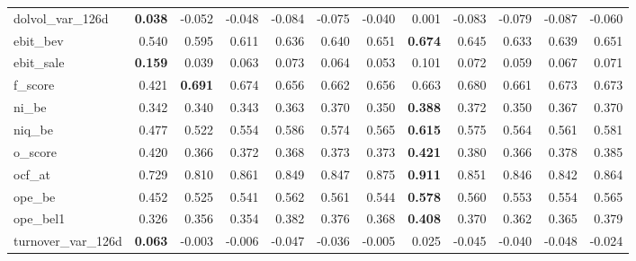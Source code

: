 \begin{landscape}
\begin{longtable}{>{\raggedright\arraybackslash}p{2.6cm}rrrrrrrrrrr}
dolvol\_var\_126d & \textbf{0.038} & -0.052 & -0.048 & -0.084 & -0.075 & -0.040 & 0.001 & -0.083 & -0.079 & -0.087 & -0.060 \\
ebit\_bev & 0.540 & 0.595 & \cellcolor{blue!10}0.611 & \cellcolor{blue!10}0.636 & \cellcolor{blue!10}0.640 & \cellcolor{blue!10}0.651 & \textbf{\cellcolor{blue!10}0.674} & \cellcolor{blue!10}0.645 & \cellcolor{blue!10}0.633 & \cellcolor{blue!10}0.639 & \cellcolor{blue!10}0.651 \\
ebit\_sale & \textbf{0.159} & 0.039 & 0.063 & 0.073 & 0.064 & 0.053 & 0.101 & 0.072 & 0.059 & 0.067 & 0.071 \\
f\_score & 0.421 & \textbf{0.691} & 0.674 & 0.656 & 0.662 & 0.656 & 0.663 & 0.680 & 0.661 & 0.673 & 0.673 \\
ni\_be & 0.342 & 0.340 & \cellcolor{blue!10}0.343 & \cellcolor{blue!10}0.363 & \cellcolor{blue!10}0.370 & \cellcolor{blue!10}0.350 & \textbf{\cellcolor{blue!10}0.388} & \cellcolor{blue!10}0.372 & \cellcolor{blue!10}0.350 & \cellcolor{blue!10}0.367 & \cellcolor{blue!10}0.370 \\
niq\_be & 0.477 & 0.522 & \cellcolor{blue!10}0.554 & \cellcolor{blue!10}0.586 & \cellcolor{blue!10}0.574 & \cellcolor{blue!10}0.565 & \textbf{\cellcolor{blue!10}0.615} & \cellcolor{blue!10}0.575 & \cellcolor{blue!10}0.564 & \cellcolor{blue!10}0.561 & \cellcolor{blue!10}0.581 \\
o\_score & 0.420 & 0.366 & 0.372 & 0.368 & 0.373 & 0.373 & \textbf{\cellcolor{blue!10}0.421} & 0.380 & 0.366 & 0.378 & 0.385 \\
ocf\_at & 0.729 & 0.810 & \cellcolor{blue!10}0.861 & \cellcolor{blue!10}0.849 & \cellcolor{blue!10}0.847 & \cellcolor{blue!10}0.875 & \textbf{\cellcolor{blue!10}0.911} & \cellcolor{blue!10}0.851 & \cellcolor{blue!10}0.846 & \cellcolor{blue!10}0.842 & \cellcolor{blue!10}0.864 \\
ope\_be & 0.452 & 0.525 & \cellcolor{blue!10}0.541 & \cellcolor{blue!10}0.562 & \cellcolor{blue!10}0.561 & \cellcolor{blue!10}0.544 & \textbf{\cellcolor{blue!10}0.578} & \cellcolor{blue!10}0.560 & \cellcolor{blue!10}0.553 & \cellcolor{blue!10}0.554 & \cellcolor{blue!10}0.565 \\
ope\_bel1 & 0.326 & 0.356 & 0.354 & \cellcolor{blue!10}0.382 & \cellcolor{blue!10}0.376 & \cellcolor{blue!10}0.368 & \textbf{\cellcolor{blue!10}0.408} & \cellcolor{blue!10}0.370 & \cellcolor{blue!10}0.362 & \cellcolor{blue!10}0.365 & \cellcolor{blue!10}0.379 \\
turnover\_var\_126d & \textbf{0.063} & -0.003 & -0.006 & -0.047 & -0.036 & -0.005 & 0.025 & -0.045 & -0.040 & -0.048 & -0.024 \\

\end{longtable}
\end{landscape}
